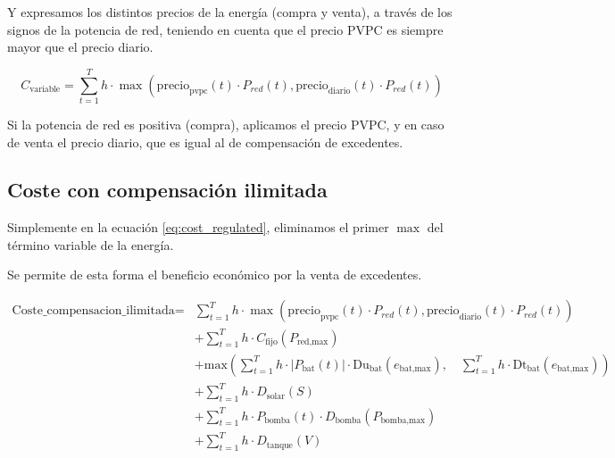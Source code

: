 Y expresamos los distintos precios de la energía (compra y venta), a través de
los signos de la potencia de red, teniendo en cuenta que el precio PVPC es
siempre mayor que el precio diario.

\begin{equation}
	C_{\text{variable}} = \sum_{t=1}^T h \cdot \max(\text{precio}_\text{pvpc}(t) \cdot P_{red}(t), \text{precio}_\text{diario}(t) \cdot P_{red}(t))
\end{equation}

Si la potencia de red es positiva (compra), aplicamos el precio PVPC, y en caso
de venta el precio diario, que es igual al de compensación de excedentes.


\subsection{Coste con compensación ilimitada}

Simplemente en la ecuación \ref{eq:cost_regulated}, eliminamos el primer $\max$
del término variable de la energía.

Se permite de esta forma el beneficio económico por la venta de excedentes.

\begin{equation} \label{eq:cost_free}
	\begin{split}
		\text{Coste\_compensacion\_ilimitada} = & \sum_{t=1}^{T} h \cdot \max(\text{precio}_\text{pvpc}(t) \cdot P_{red}(t), \text{precio}_\text{diario}(t) \cdot P_{red}(t))                                                            \\
		                                        & + \sum_{t=1}^{T} h \cdot C_\text{fijo}(P_\text{red,max})                                                                                                                               \\
		                                        & + \text{max} \left( \sum_{t=1}^{T} h \cdot |P_\text{bat}(t)| \cdot \text{Du}_\text{bat}(e_\text{bat,max}), \quad \sum_{t=1}^{T} h \cdot \text{Dt}_\text{bat}(e_\text{bat,max}) \right) \\
		                                        & + \sum_{t=1}^{T} h \cdot D_\text{solar}(S)                                                                                                                                             \\
		                                        & + \sum_{t=1}^{T} h \cdot P_\text{bomba}(t) \cdot D_\text{bomba}(P_\text{bomba,max})                                                                                                    \\
		                                        & + \sum_{t=1}^{T} h \cdot D_\text{tanque}(V)
	\end{split}
\end{equation}

